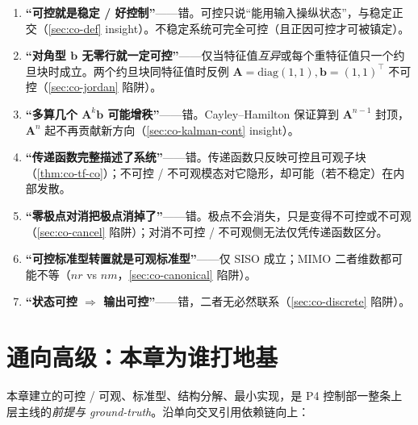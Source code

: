 \begin{enumerate}
  \item \textbf{“可控就是稳定 / 好控制”}——错。可控只说“能用输入操纵状态”，与稳定正交（\cref{sec:co-def} insight）。不稳定系统可完全可控（且正因可控才可被镇定）。
  \item \textbf{“对角型 $\mathbf{b}$ 无零行就一定可控”}——仅当特征值\emph{互异}或每个重特征值只一个约旦块时成立。两个约旦块同特征值时反例 $\mathbf{A}=\mathrm{diag}(1,1),\mathbf{b}=(1,1)^\top$ 不可控（\cref{sec:co-jordan} 陷阱）。
  \item \textbf{“多算几个 $\mathbf{A}^k\mathbf{b}$ 可能增秩”}——错。Cayley--Hamilton 保证算到 $\mathbf{A}^{n-1}$ 封顶，$\mathbf{A}^n$ 起不再贡献新方向（\cref{sec:co-kalman-cont} insight）。
  \item \textbf{“传递函数完整描述了系统”}——错。传递函数只反映可控且可观子块（\cref{thm:co-tf-co}）；不可控 / 不可观模态对它隐形，却可能（若不稳定）在内部发散。
  \item \textbf{“零极点对消把极点消掉了”}——错。极点不会消失，只是变得不可控或不可观（\cref{sec:co-cancel} 陷阱）；对消不可控 / 不可观侧无法仅凭传递函数区分。
  \item \textbf{“可控标准型转置就是可观标准型”}——仅 SISO 成立；MIMO 二者维数都可能不等（$nr$ vs $nm$，\cref{sec:co-canonical} 陷阱）。
  \item \textbf{“状态可控 $\Rightarrow$ 输出可控”}——错，二者无必然联系（\cref{sec:co-discrete} 陷阱）。
\end{enumerate}

\section{通向高级：本章为谁打地基}
\label{sec:co-outlook}

本章建立的可控 / 可观、标准型、结构分解、最小实现，是 P4 控制部一整条上层主线的\emph{前提与 ground-truth}。沿单向交叉引用依赖链向上：

